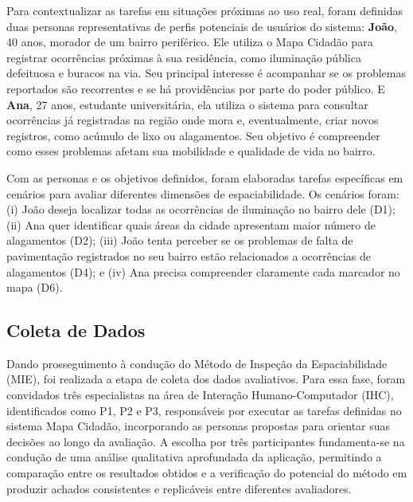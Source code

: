 \documentclass[12pt]{article}
\begin{document}
Para contextualizar as tarefas em situações próximas ao uso real, foram definidas duas personas representativas de perfis potenciais de usuários do sistema: \textbf{João}, 40 anos, morador de um bairro periférico. Ele utiliza o Mapa Cidadão para registrar ocorrências próximas à sua residência, como iluminação pública defeituosa e buracos na via. Seu principal interesse é acompanhar se os problemas reportados são recorrentes e se há providências por parte do poder público. E \textbf{Ana}, 27 anos, estudante universitária, ela utiliza o sistema para consultar ocorrências já registradas na região onde mora e, eventualmente, criar novos registros, como acúmulo de lixo ou alagamentos. Seu objetivo é compreender como esses problemas afetam sua mobilidade e qualidade de vida no bairro.


Com as personas e os objetivos definidos, foram elaboradas tarefas específicas em cenários para avaliar diferentes dimensões de espaciabilidade. Os cenários foram: (i) João deseja localizar todas as ocorrências de iluminação no bairro dele (D1); (ii) Ana quer identificar quais áreas da cidade apresentam maior número de alagamentos (D2); (iii) João tenta perceber se os problemas de falta de pavimentação registrados no seu bairro estão relacionados a ocorrências de alagamentos (D4); e (iv) Ana precisa compreender claramente cada marcador no mapa (D6).

\subsection{Coleta de Dados}

Dando prosseguimento à condução do Método de Inspeção da Espaciabilidade (MIE), foi realizada a etapa de coleta dos dados avaliativos. Para essa fase, foram convidados três especialistas na área de Interação Humano-Computador (IHC), identificados como P1, P2 e P3, responsáveis por executar as tarefas definidas no sistema Mapa Cidadão, incorporando as personas propostas para orientar suas decisões ao longo da avaliação. A escolha por três participantes fundamenta-se na condução de uma análise qualitativa aprofundada da aplicação, permitindo a comparação entre os resultados obtidos e a verificação do potencial do método em produzir achados consistentes e replicáveis entre diferentes avaliadores.
\end{document}
